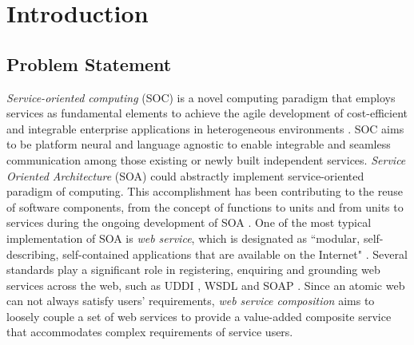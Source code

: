 \chapter{Introduction}\label{C:intro}

\section{Problem Statement}
\emph{Service-oriented computing} (SOC) is a novel computing paradigm that employs services as fundamental elements to achieve the agile development of cost-efficient and integrable enterprise applications in heterogeneous environments \cite{papazoglou2003service, papazoglou2006p}. SOC aims to be platform neural and language agnostic to enable integrable and seamless communication among those existing or newly built independent services. \emph{Service Oriented Architecture} (SOA)  could abstractly implement service-oriented paradigm of computing. This accomplishment has been contributing to the reuse of software components, from the concept of functions to units and from units to services during the ongoing development of SOA \cite{booth2004web, overdick2007resource}. One of the most typical implementation of SOA is \emph{web service}, which is designated as ``modular, self-describing, self-contained applications that are available on the Internet" \cite{curbera2001web}. Several standards play a significant role in registering, enquiring and grounding web services across the web, such as UDDI \cite{curbera2002unraveling}, WSDL \cite{lausen2007semantic} and SOAP \cite{fensel2011semantic}. Since an atomic web can not always satisfy users' requirements, \emph{web service composition} aims to loosely couple a set of web services to provide a value-added composite service that accommodates complex requirements of service users. 

